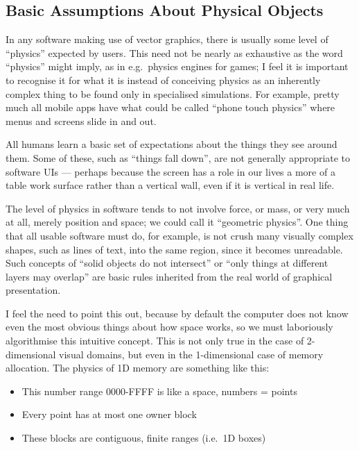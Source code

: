 \hypertarget{basic-assumptions-about-physical-objects}{%
\subsection{Basic Assumptions About Physical
Objects}\label{basic-assumptions-about-physical-objects}}

In any software making use of vector graphics, there is usually some
level of ``physics'' expected by users. This need not be nearly as
exhaustive as the word ``physics'' might imply, as in e.g.~physics
engines for games; I feel it is important to recognise it for what it is
instead of conceiving physics as an inherently complex thing to be found
only in specialised simulations. For example, pretty much all mobile
apps have what could be called ``phone touch physics'' where menus and
screens slide in and out.

All humans learn a basic set of expectations about the things they see
around them. Some of these, such as ``things fall down'', are not
generally appropriate to software UIs --- perhaps because the screen has
a role in our lives a more of a table work surface rather than a
vertical wall, even if it is vertical in real life.

The level of physics in software tends to not involve force, or mass, or
very much at all, merely position and space; we could call it
``geometric physics''. One thing that all usable software must do, for
example, is not crush many visually complex shapes, such as lines of
text, into the same region, since it becomes unreadable. Such concepts
of ``solid objects do not intersect'' or ``only things at different
layers may overlap'' are basic rules inherited from the real world of
graphical presentation.

I feel the need to point this out, because by default the computer does
not know even the most obvious things about how space works, so we must
laboriously algorithmise this intuitive concept. This is not only true
in the case of 2-dimensional visual domains, but even in the
1-dimensional case of memory allocation. The physics of 1D memory are
something like this:

\begin{itemize}
\tightlist
\item
  This number range 0000-FFFF is like a space, numbers = points
\item
  Every point has at most one owner block
\item
  These blocks are contiguous, finite ranges (i.e.~1D boxes)
\end{itemize}

